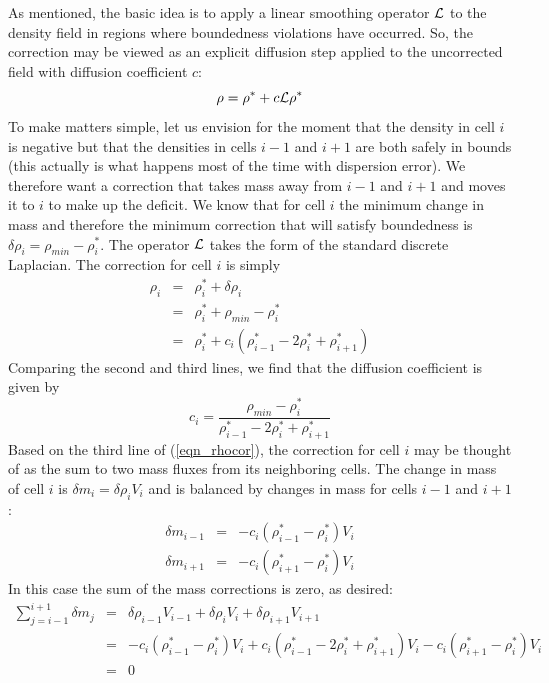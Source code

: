 As mentioned, the basic idea is to apply a linear smoothing operator $\cal L$ to the density field in regions where boundedness violations have occurred. So, the correction may be viewed as an explicit diffusion step applied to the uncorrected field with diffusion coefficient $c$:
\begin{equation}
\rho = \rho^* + c {\cal L} \rho^*
\end{equation}
To make matters simple, let us envision for the moment that the density in cell $i$ is negative but that the densities in cells $i-1$ and $i+1$ are both safely in bounds (this actually is what happens most of the time with dispersion error).  We therefore want a correction that takes mass away from $i-1$ and $i+1$ and moves it to $i$ to make up the deficit.  We know that for cell $i$ the minimum change in mass and therefore the minimum correction that will satisfy boundedness is $\delta \rho_i = \rho_{min} - \rho_i^*$.  The operator $\cal L$ takes the form of the standard discrete Laplacian.  The correction for cell $i$ is simply
\begin{eqnarray}
\label{eqn_rhocor}
\rho_i &=& \rho_i^* + \delta \rho_i \nonumber\\
&=& \rho_i^* + \rho_{min} - \rho_i^* \nonumber\\
&=&  \rho_i^* + c_i (\rho_{i-1}^* - 2 \rho_i^* + \rho_{i+1}^*)
\end{eqnarray}
Comparing the second and third lines, we find that the diffusion coefficient is given by
\begin{equation}
\label{eqn_diffcoef}
c_i = \frac{\rho_{min} - \rho_i^*}{\rho_{i-1}^* - 2 \rho_i^* + \rho_{i+1}^*}
\end{equation}
Based on the third line of (\ref{eqn_rhocor}), the correction for cell $i$ may be thought of as the sum to two mass fluxes from its neighboring cells.  The change in mass of cell $i$ is $\delta m_i = \delta \rho_i V_i$ and is balanced by changes in mass for cells $i-1$ and $i+1$:
\begin{eqnarray}
\delta m_{i-1} &=& - c_i (\rho_{i-1}^* - \rho_i^*) V_i \nonumber\\
\delta m_{i+1} &=& - c_i (\rho_{i+1}^* - \rho_i^*) V_i \nonumber
\end{eqnarray}
In this case the sum of the mass corrections is zero, as desired:
\begin{eqnarray}
\sum_{j=i-1}^{i+1} \delta m_j &=& \delta \rho_{i-1} V_{i-1} + \delta \rho_i V_i + \delta \rho_{i+1}V_{i+1} \nonumber\\
&=& - c_i (\rho_{i-1}^* - \rho_i^*) V_i + c_i (\rho_{i-1}^* - 2 \rho_i^* + \rho_{i+1}^*) V_i - c_i (\rho_{i+1}^* - \rho_i^*) V_i \nonumber\\
&=& 0 \nonumber
\end{eqnarray}

